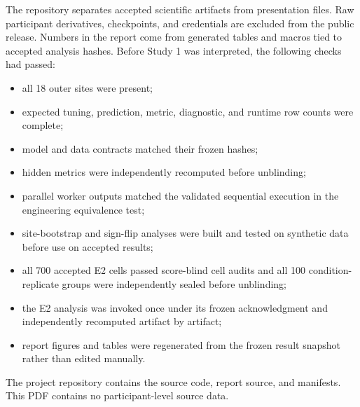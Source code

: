 \documentclass[11pt,a4paper]{article}
\begin{document}
The repository separates accepted scientific artifacts from presentation
files. Raw participant derivatives, checkpoints, and credentials are excluded
from the public release. Numbers in the report come from generated tables and
macros tied to accepted analysis hashes. Before Study 1 was interpreted, the
following checks had passed:

\begin{itemize}
  \item all 18 outer sites were present;
  \item expected tuning, prediction, metric, diagnostic, and runtime row counts
  were complete;
  \item model and data contracts matched their frozen hashes;
  \item hidden metrics were independently recomputed before unblinding;
  \item parallel worker outputs matched the validated sequential execution in
  the engineering equivalence test;
  \item site-bootstrap and sign-flip analyses were built and tested on
  synthetic data before use on accepted results;
  \item all 700 accepted E2 cells passed score-blind cell audits and all 100
  condition-replicate groups were independently sealed before unblinding;
  \item the E2 analysis was invoked once under its frozen acknowledgment and
  independently recomputed artifact by artifact;
  \item report figures and tables were regenerated from the frozen result
  snapshot rather than edited manually.
\end{itemize}

The project repository contains the source code, report source, and
manifests. This PDF contains no participant-level source data.

\begin{singlespace}
\scriptsize


\end{singlespace}
\end{document}
